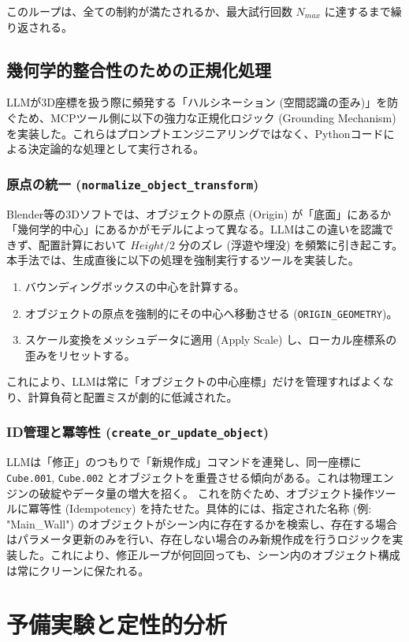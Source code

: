 \documentclass{deimj}
\begin{document}
このループは、全ての制約が満たされるか、最大試行回数 $N_{max}$ に達するまで繰り返される。

\subsection{幾何学的整合性のための正規化処理}
LLMが3D座標を扱う際に頻発する「ハルシネーション (空間認識の歪み)」を防ぐため、MCPツール側に以下の強力な正規化ロジック (Grounding Mechanism) を実装した。これらはプロンプトエンジニアリングではなく、Pythonコードによる決定論的な処理として実行される。

\subsubsection{原点の統一 (\texttt{normalize\_object\_transform})}
Blender等の3Dソフトでは、オブジェクトの原点 (Origin) が「底面」にあるか「幾何学的中心」にあるかがモデルによって異なる。LLMはこの違いを認識できず、配置計算において $Height/2$ 分のズレ (浮遊や埋没) を頻繁に引き起こす。
本手法では、生成直後に以下の処理を強制実行するツールを実装した。
\begin{enumerate}
 \item バウンディングボックスの中心を計算する。
 \item オブジェクトの原点を強制的にその中心へ移動させる (\texttt{ORIGIN\_GEOMETRY})。
 \item スケール変換をメッシュデータに適用 (Apply Scale) し、ローカル座標系の歪みをリセットする。
\end{enumerate}
これにより、LLMは常に「オブジェクトの中心座標」だけを管理すればよくなり、計算負荷と配置ミスが劇的に低減された。

\subsubsection{ID管理と冪等性 (\texttt{create\_or\_update\_object})}
LLMは「修正」のつもりで「新規作成」コマンドを連発し、同一座標に \texttt{Cube.001}, \texttt{Cube.002} とオブジェクトを重畳させる傾向がある。これは物理エンジンの破綻やデータ量の増大を招く。
これを防ぐため、オブジェクト操作ツールに冪等性 (Idempotency) を持たせた。具体的には、指定された名称 (例: "Main\_Wall") のオブジェクトがシーン内に存在するかを検索し、存在する場合はパラメータ更新のみを行い、存在しない場合のみ新規作成を行うロジックを実装した。これにより、修正ループが何回回っても、シーン内のオブジェクト構成は常にクリーンに保たれる。

\section{予備実験と定性的分析}
\end{document}
